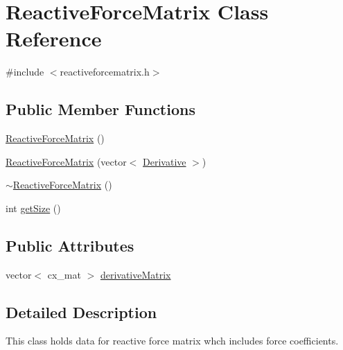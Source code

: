 \hypertarget{class_reactive_force_matrix}{\section{Reactive\-Force\-Matrix Class Reference}
\label{class_reactive_force_matrix}
}


{\ttfamily \#include $<$reactiveforcematrix.\-h$>$}

\subsection*{Public Member Functions}
\begin{DoxyCompactItemize}
\item 
\hyperlink{class_reactive_force_matrix_aea5a7bd4e681f113e33b163636da4da3}{Reactive\-Force\-Matrix} ()
\item 
\hyperlink{class_reactive_force_matrix_aeb1efffa867375a0e9a08b29ef0a5dd7}{Reactive\-Force\-Matrix} (vector$<$ \hyperlink{class_derivative}{Derivative} $>$)
\item 
\hyperlink{class_reactive_force_matrix_a720e6d74747ee2eb9a8891271c336c1f}{$\sim$\-Reactive\-Force\-Matrix} ()
\item 
int \hyperlink{class_reactive_force_matrix_abb1779e0cb13c2ff1a8d5c0fade96f0d}{get\-Size} ()
\end{DoxyCompactItemize}
\subsection*{Public Attributes}
\begin{DoxyCompactItemize}
\item 
vector$<$ cx\-\_\-mat $>$ \hyperlink{class_reactive_force_matrix_ad135b340ce06171b13a5573fef714707}{derivative\-Matrix}
\end{DoxyCompactItemize}


\subsection{Detailed Description}
This class holds data for reactive force matrix whch includes force coefficients. 

